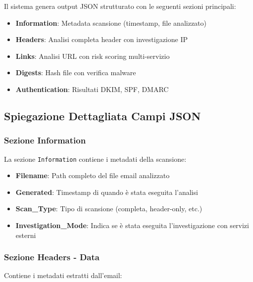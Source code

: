 \documentclass{article}
\begin{document}
Il sistema genera output JSON strutturato con le seguenti sezioni principali:

\begin{itemize}
    \item \textbf{Information}: Metadata scansione (timestamp, file analizzato)
    \item \textbf{Headers}: Analisi completa header con investigazione IP
    \item \textbf{Links}: Analisi URL con risk scoring multi-servizio
    \item \textbf{Digests}: Hash file con verifica malware
    \item \textbf{Authentication}: Risultati DKIM, SPF, DMARC
\end{itemize}

\subsection{Spiegazione Dettagliata Campi JSON}

\subsubsection{Sezione Information}

La sezione \texttt{Information} contiene i metadati della scansione:

\begin{itemize}
    \item \textbf{Filename}: Path completo del file email analizzato
    \item \textbf{Generated}: Timestamp di quando è stata eseguita l'analisi
    \item \textbf{Scan\_Type}: Tipo di scansione (completa, header-only, etc.)
    \item \textbf{Investigation\_Mode}: Indica se è stata eseguita l'investigazione con servizi esterni
\end{itemize}

\subsubsection{Sezione Headers - Data}

Contiene i metadati estratti dall'email:
\end{document}
